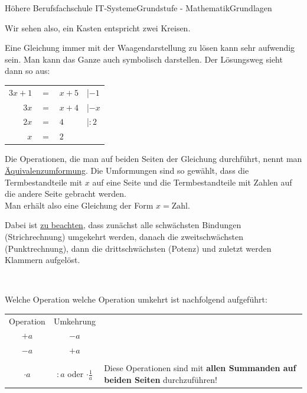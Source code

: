 \documentclass[11pt,twocolumn,oneside,openany,headings=optiontotoc,11pt,numbers=noenddot]{article}
\begin{document}
\begin{worksheet}{Höhere Berufsfachschule IT-Systeme}{Grundstufe - Mathematik}{Grundlagen}
\begin{framed}
			\raggedright
			Wir sehen also, ein Kasten entspricht zwei Kreisen.\\
		\end{framed}
		\par\bigskip\noindent
		Eine Gleichung immer mit der Waagendarstellung zu lösen kann sehr aufwendig sein. Man kann das Ganze auch symbolisch darstellen. Der Lösungsweg sieht dann so aus:
		\begin{tabularx}{0.5\textwidth}{rcll}
			\(3x + 1\) & \(=\) & \(x+5\) & |\(-1\)\\
			\(3x\) & \(=\) & \(x+4\) & |\(-x\)\\
			\(2x\) & \(=\) & \(4\) & |\(:2\)\\
			\(x\) & \(=\) & \(2\)
		\end{tabularx}
		Die Operationen, die man auf beiden Seiten der Gleichung durchführt, nennt man \underline{Äquivalenzumformung}. Die Umformungen sind so gewählt, dass die Termbestandteile mit \(x\) auf eine Seite und die Termbestandteile mit Zahlen auf die andere Seite gebracht werden.\\
		Man erhält also eine Gleichung der Form \(x = \text{Zahl}\).\\
		\par\bigskip\noindent
		Dabei ist \underline{zu beachten}, dass zunächst alle schwächsten Bindungen (\color{blue}Stri\normalcolor{}chrechnung) umgekehrt werden, danach die zweitschwächsten (\color{blue}Pu\normalcolor{}nktrechnung), dann die drittschwächsten (\color{blue}Po\normalcolor{}tenz) und zuletzt werden \color{blue}Kla\normalcolor{}mmern aufgelöst.\\
		\par\bigskip\noindent
		\centering
		\\
		\raggedright
		\par\bigskip\noindent
		Welche Operation welche Operation umkehrt ist nachfolgend aufgeführt:
		\begin{tabularx}{0.45\textwidth}{|c|c|X|}
			\cline{1-2}
			Operation & Umkehrung & \multicolumn{1}{l}{}\\
			\cline{1-2}
			\(+a\) & \(-a\) & \multicolumn{1}{l}{} \\
			\cline{1-2}
			\(-a\) & \(+a\) & \multicolumn{1}{l}{} \\
			\hline
			\multicolumn{1}{|l|}{} & & \\
			\(\cdot{}a\) & \(:a\) oder \(\cdot{}\frac{1}{a}\) &
			\multirow{7}{0.1\textheight}{Diese Operationen sind mit \textbf{allen Summanden auf beiden Seiten} durchzuführen!}\\

\end{tabularx}
\end{worksheet}
\end{document}
